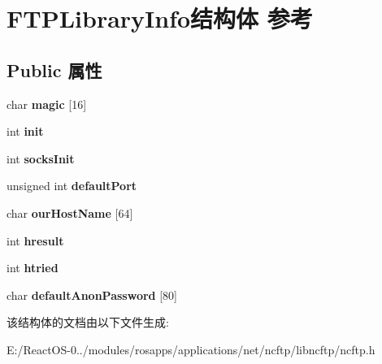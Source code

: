 \hypertarget{struct_f_t_p_library_info}{}\section{F\+T\+P\+Library\+Info结构体 参考}
\label{struct_f_t_p_library_info}
\subsection*{Public 属性}
\begin{DoxyCompactItemize}
\item 
\mbox{\label{struct_f_t_p_library_info_abbb6533243840a7558b5bdef322d6660}} 
char {\bfseries magic} \mbox{[}16\mbox{]}
\item 
\mbox{\label{struct_f_t_p_library_info_a0fe6ca9d64b52158c72d41a0ae1bd704}} 
int {\bfseries init}
\item 
\mbox{\label{struct_f_t_p_library_info_a18ab5bcc659e50db019e94cc1496cd5d}} 
int {\bfseries socks\+Init}
\item 
\mbox{\label{struct_f_t_p_library_info_af2440501b2281b72a9cb6e88cc68f8c1}} 
unsigned int {\bfseries default\+Port}
\item 
\mbox{\label{struct_f_t_p_library_info_ace98adf9216239a73ad268365104d16b}} 
char {\bfseries our\+Host\+Name} \mbox{[}64\mbox{]}
\item 
\mbox{\label{struct_f_t_p_library_info_a7aa018d7e37761f0541e7a98d87d0e9a}} 
int {\bfseries hresult}
\item 
\mbox{\label{struct_f_t_p_library_info_aeb707f150d05382a9fa2cd28660dabbd}} 
int {\bfseries htried}
\item 
\mbox{\label{struct_f_t_p_library_info_a5f0fbd01ff6ee04496f87ddf3133584d}} 
char {\bfseries default\+Anon\+Password} \mbox{[}80\mbox{]}
\end{DoxyCompactItemize}


该结构体的文档由以下文件生成\+:\begin{DoxyCompactItemize}
\item 
E\+:/\+React\+O\+S-\/0../modules/rosapps/applications/net/ncftp/libncftp/ncftp.\+h\end{DoxyCompactItemize}
